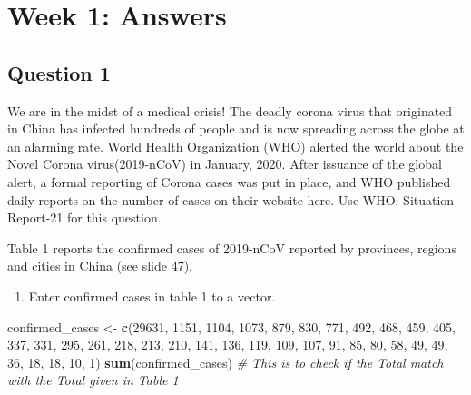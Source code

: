 \documentclass[]{article}
\author{}
\date{\vspace{-2.5em}}
\newenvironment{Shaded}{\begin{snugshade}}{\end{snugshade}}
\newcommand{\CommentTok}[1]{\textcolor[rgb]{0.56,0.35,0.01}{\textit{#1}}}
\newcommand{\DecValTok}[1]{\textcolor[rgb]{0.00,0.00,0.81}{#1}}
\newcommand{\KeywordTok}[1]{\textcolor[rgb]{0.13,0.29,0.53}{\textbf{#1}}}
\newcommand{\NormalTok}[1]{#1}
\newcommand{\StringTok}[1]{\textcolor[rgb]{0.31,0.60,0.02}{#1}}
\providecommand{\tightlist}{%
  \setlength{\itemsep}{0pt}\setlength{\parskip}{0pt}}
\begin{document}
\hypertarget{week-1-answers}{%
\section{Week 1: Answers}\label{week-1-answers}}

\hypertarget{question-1}{%
\subsection{Question 1}\label{question-1}}

We are in the midst of a medical crisis! The deadly corona virus that
originated in China has infected hundreds of people and is now spreading
across the globe at an alarming rate. World Health Organization (WHO)
alerted the world about the Novel Corona virus(2019-nCoV) in January,
2020. After issuance of the global alert, a formal reporting of Corona
cases was put in place, and WHO published daily reports on the number of
cases on their website here. Use WHO: Situation Report-21 for this
question.

Table 1 reports the confirmed cases of 2019-nCoV reported by provinces,
regions and cities in China (see slide 47).

\begin{enumerate}
\def\labelenumi{\roman{enumi})}
\tightlist
\item
  Enter confirmed cases in table 1 to a vector.
\end{enumerate}

\begin{Shaded}
\begin{Highlighting}[]
\NormalTok{confirmed_cases <-}\StringTok{ }\KeywordTok{c}\NormalTok{(}\DecValTok{29631}\NormalTok{, }\DecValTok{1151}\NormalTok{, }\DecValTok{1104}\NormalTok{, }\DecValTok{1073}\NormalTok{, }\DecValTok{879}\NormalTok{, }\DecValTok{830}\NormalTok{, }\DecValTok{771}\NormalTok{, }\DecValTok{492}\NormalTok{, }\DecValTok{468}\NormalTok{, }\DecValTok{459}\NormalTok{, }\DecValTok{405}\NormalTok{,}
                     \DecValTok{337}\NormalTok{, }\DecValTok{331}\NormalTok{, }\DecValTok{295}\NormalTok{, }\DecValTok{261}\NormalTok{, }\DecValTok{218}\NormalTok{, }\DecValTok{213}\NormalTok{, }\DecValTok{210}\NormalTok{, }\DecValTok{141}\NormalTok{, }\DecValTok{136}\NormalTok{, }\DecValTok{119}\NormalTok{, }\DecValTok{109}\NormalTok{, }\DecValTok{107}\NormalTok{,}
                     \DecValTok{91}\NormalTok{, }\DecValTok{85}\NormalTok{, }\DecValTok{80}\NormalTok{, }\DecValTok{58}\NormalTok{, }\DecValTok{49}\NormalTok{, }\DecValTok{49}\NormalTok{, }\DecValTok{36}\NormalTok{, }\DecValTok{18}\NormalTok{, }\DecValTok{18}\NormalTok{, }\DecValTok{10}\NormalTok{, }\DecValTok{1}\NormalTok{)}
\KeywordTok{sum}\NormalTok{(confirmed_cases) }\CommentTok{# This is to check if the Total match with the Total given in Table 1}
\end{Highlighting}
\end{Shaded}
\end{document}
